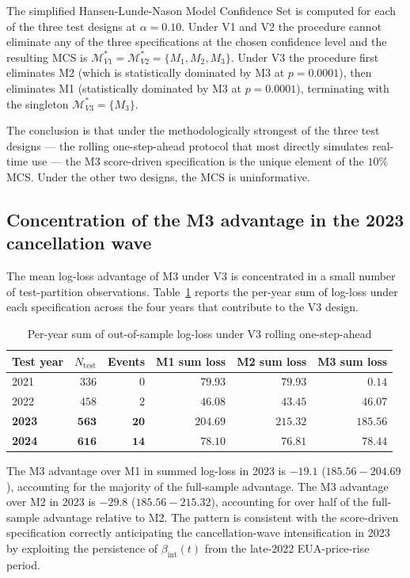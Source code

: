 \documentclass[12pt,a4paper]{article}
\newcommand{\bint}{\beta_{\text{int}}}
\theoremstyle{plain}
\theoremstyle{definition}
\begin{document}
The simplified Hansen-Lunde-Nason Model Confidence Set is computed for each of the three test designs at $\alpha = 0.10$. Under V1 and V2 the procedure cannot eliminate any of the three specifications at the chosen confidence level and the resulting MCS is $\mathcal{M}^*_{V1} = \mathcal{M}^*_{V2} = \{M_1, M_2, M_3\}$. Under V3 the procedure first eliminates M2 (which is statistically dominated by M3 at $p = 0.0001$), then eliminates M1 (statistically dominated by M3 at $p = 0.0001$), terminating with the singleton $\mathcal{M}^*_{V3} = \{M_3\}$.

The conclusion is that under the methodologically strongest of the three test designs --- the rolling one-step-ahead protocol that most directly simulates real-time use --- the M3 score-driven specification is the unique element of the $10\%$ MCS. Under the other two designs, the MCS is uninformative.

\subsection{Concentration of the M3 advantage in the 2023 cancellation wave}
\label{sec:results-concentration}

The mean log-loss advantage of M3 under V3 is concentrated in a small number of test-partition observations. Table~\ref{tab:results-per-year} reports the per-year sum of log-loss under each specification across the four years that contribute to the V3 design.

\begin{table}[!htbp]
\centering
\caption{Per-year sum of out-of-sample log-loss under V3 rolling one-step-ahead}
\label{tab:results-per-year}
\begin{tabular}{lrrrrr}
\toprule
Test year & $N_{\text{test}}$ & Events & M1 sum loss & M2 sum loss & M3 sum loss \\
\midrule
2021 & $336$ & $0$ & $79.93$ & $79.93$ & $\mathbf{0.14}$ \\
2022 & $458$ & $2$ & $46.08$ & $43.45$ & $46.07$ \\
\textbf{2023} & $\mathbf{563}$ & $\mathbf{20}$ & $\mathbf{204.69}$ & $\mathbf{215.32}$ & $\mathbf{185.56}$ \\
\textbf{2024} & $\mathbf{616}$ & $\mathbf{14}$ & $78.10$ & $76.81$ & $78.44$ \\
\bottomrule
\end{tabular}
\end{table}

The M3 advantage over M1 in summed log-loss in 2023 is $-19.1$ ($185.56 - 204.69$), accounting for the majority of the full-sample advantage. The M3 advantage over M2 in 2023 is $-29.8$ ($185.56 - 215.32$), accounting for over half of the full-sample advantage relative to M2. The pattern is consistent with the score-driven specification correctly anticipating the cancellation-wave intensification in 2023 by exploiting the persistence of $\bint(t)$ from the late-2022 EUA-price-rise period.
\end{document}
